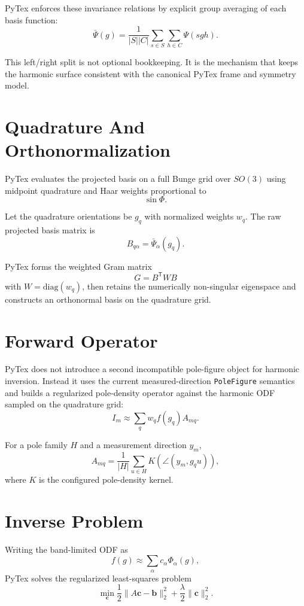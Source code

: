 \documentclass[11pt]{article}
\begin{document}
PyTex enforces these invariance relations by explicit group averaging of each basis
function:
\[
  \bar{\Psi}(g)
  =
  \frac{1}{|S||C|}
  \sum_{s \in S}
  \sum_{h \in C}
  \Psi(s g h).
\]

This left/right split is not optional bookkeeping. It is the mechanism that keeps the
harmonic surface consistent with the canonical PyTex frame and symmetry model.

\section{Quadrature And Orthonormalization}

PyTex evaluates the projected basis on a full Bunge grid over \(SO(3)\) using midpoint
quadrature and Haar weights proportional to
\[
  \sin\Phi.
\]

Let the quadrature orientations be \(g_q\) with normalized weights \(w_q\). The raw
projected basis matrix is
\[
  B_{q\alpha} = \bar{\Psi}_{\alpha}(g_q).
\]

PyTex forms the weighted Gram matrix
\[
  G = B^{\mathsf T} W B
\]
with \(W = \mathrm{diag}(w_q)\), then retains the numerically non-singular eigenspace and
constructs an orthonormal basis on the quadrature grid.

\section{Forward Operator}

PyTex does not introduce a second incompatible pole-figure object for harmonic inversion.
Instead it uses the current measured-direction \texttt{PoleFigure} semantics and builds a
regularized pole-density operator against the harmonic ODF sampled on the quadrature grid:
\[
  I_m
  \approx
  \sum_q
  w_q f(g_q) A_{mq}.
\]

For a pole family \(H\) and a measurement direction \(y_m\),
\[
  A_{mq}
  =
  \frac{1}{|H|}
  \sum_{u \in H}
  K\!\left(\angle(y_m, g_q u)\right),
\]
where \(K\) is the configured pole-density kernel.

\section{Inverse Problem}

Writing the band-limited ODF as
\[
  f(g) \approx \sum_{\alpha} c_{\alpha}\Phi_{\alpha}(g),
\]
PyTex solves the regularized least-squares problem
\[
  \min_{\mathbf{c}}
  \frac{1}{2}
  \lVert A\mathbf{c} - \mathbf{b} \rVert_2^2
  +
  \frac{\lambda}{2}
  \lVert \mathbf{c} \rVert_2^2.
\]
\end{document}
